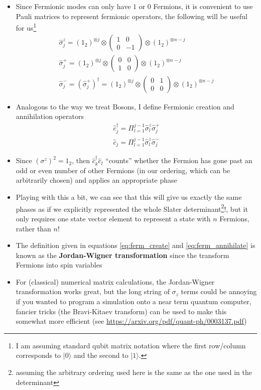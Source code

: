 \documentclass[english]{article}
\newcommand{\ket}[1]{|#1 \rangle}
\begin{document}
\begin{itemize}
\item Since Fermionic modes can only have $1$ or $0$ Fermions, it is convenient to use Pauli matrices to represent fermionic operators, the following will be useful for us\footnote{I am assuming standard qubit matrix notation where the first row/column corresponds to $\ket{0}$ and the second to $\ket{1}$.} 
\begin{align}
\hat{\sigma}_j^z=(1_2)^{\otimes j}\otimes\left(\begin{array}{cc} 1 & 0 \\ 0 & -1 \end{array} \right)\otimes (1_2)^{\otimes n-j}\\
\hat{\sigma}_j^+=(1_2)^{\otimes j}\otimes\left(\begin{array}{cc} 0 & 0 \\ 1 & 0 \end{array} \right)\otimes (1_2)^{\otimes n-j}\\
\hat{\sigma}_j^-=(\hat{\sigma}_j^+)^\dagger=(1_2)^{\otimes j}\otimes\left(\begin{array}{cc} 0 & 1 \\ 0 & 0 \end{array} \right)\otimes (1_2)^{\otimes n-j}
\end{align}
\item Analogous to the way we treat Bosons, I define Fermionic creation and annihilation operators
\begin{align}
\hat{c}^\dagger_j=\Pi_{l=1}^{j-1}\hat{\sigma}^z_l\hat{\sigma}^+_j \label{eq:ferm_create}\\
\hat{c}_j=\Pi_{l=1}^{j-1}\hat{\sigma}^z_l\hat{\sigma}^-_j \label{eq:ferm_annihilate}
\end{align}
\item Since $(\sigma^z)^2=1_2$, then $\hat{c}^\dagger_k\hat{c}_l$ ``counts'' whether the Fermion has gone past an odd or even number of other Fermions (in our ordering, which can be arbitrarily chosen) and applies an appropriate phase
\item Playing with this a bit, we can see that this will give us exactly the same phases as if we explicitly represented the whole Slater determinant\footnote{assuming the arbitrary ordering used here is the same as the one used in the determinant}!, but it only requires one state vector element to represent a state with $n$ Fermions, rather than $n!$
\item The definition given in equations \ref{eq:ferm_create} and \ref{eq:ferm_annihilate} is known as the \textbf{Jordan-Wigner transformation} since the transform Fermions into spin variables
\item For (classical) numerical matrix calculations, the Jordan-Wigner transformation works great, but the long string of $\sigma_z$ terms could be annoying if you wanted to program a simulation onto a near term quantum computer, fancier tricks (the Bravi-Kitaev transform) can be used to make this somewhat more efficient (see \href{https://arxiv.org/pdf/quant-ph/0003137.pdf}{https://arxiv.org/pdf/quant-ph/0003137.pdf})


\end{itemize}
\end{document}
